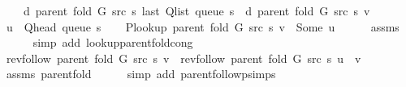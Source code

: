 \begin{isabellebody}
\ \ \ \ {\isachardoublequoteopen}d\ {\isacharparenleft}{\kern0pt}parent\ {\isacharparenleft}{\kern0pt}fold\ G\ src\ s{\isacharparenright}{\kern0pt}{\isacharparenright}{\kern0pt}\ {\isacharparenleft}{\kern0pt}last\ {\isacharparenleft}{\kern0pt}Q{\isacharunderscore}{\kern0pt}list\ {\isacharparenleft}{\kern0pt}queue\ s{\isacharparenright}{\kern0pt}{\isacharparenright}{\kern0pt}{\isacharparenright}{\kern0pt}\ {\isasymle}\ d\ {\isacharparenleft}{\kern0pt}parent\ {\isacharparenleft}{\kern0pt}fold\ G\ src\ s{\isacharparenright}{\kern0pt}{\isacharparenright}{\kern0pt}\ v{\isachardoublequoteclose}%
\endisataginvisible
{\isafoldinvisible}%
%
\isadeliminvisible
\isanewline
%
\endisadeliminvisible
%
\isadelimproof
%
\endisadelimproof
%
\isatagproof
{}\isamarkupfalse%
\ {\isacharminus}{\kern0pt}\isanewline
\ \ \isamarkupfalse%
\ {\isacharquery}{\kern0pt}u\ {\isacharequal}{\kern0pt}\ {\isachardoublequoteopen}Q{\isacharunderscore}{\kern0pt}head\ {\isacharparenleft}{\kern0pt}queue\ s{\isacharparenright}{\kern0pt}{\isachardoublequoteclose}\isanewline
\ \ \isamarkupfalse%
\ {\isachardoublequoteopen}P{\isacharunderscore}{\kern0pt}lookup\ {\isacharparenleft}{\kern0pt}parent\ {\isacharparenleft}{\kern0pt}fold\ G\ src\ s{\isacharparenright}{\kern0pt}{\isacharparenright}{\kern0pt}\ v\ {\isacharequal}{\kern0pt}\ Some\ {\isacharquery}{\kern0pt}u{\isachardoublequoteclose}\isanewline
\ \ \ \ \isamarkupfalse%
\ assms\isanewline
\ \ \ \ \isamarkupfalse%
\ {\isacharparenleft}{\kern0pt}simp\ add{\isacharcolon}{\kern0pt}\ lookup{\isacharunderscore}{\kern0pt}parent{\isacharunderscore}{\kern0pt}fold{\isacharunderscore}{\kern0pt}cong{\isacharparenright}{\kern0pt}\isanewline
\ \ \isamarkupfalse%
\ {\isachardoublequoteopen}rev{\isacharunderscore}{\kern0pt}follow\ {\isacharparenleft}{\kern0pt}parent\ {\isacharparenleft}{\kern0pt}fold\ G\ src\ s{\isacharparenright}{\kern0pt}{\isacharparenright}{\kern0pt}\ v\ {\isacharequal}{\kern0pt}\ rev{\isacharunderscore}{\kern0pt}follow\ {\isacharparenleft}{\kern0pt}parent\ {\isacharparenleft}{\kern0pt}fold\ G\ src\ s{\isacharparenright}{\kern0pt}{\isacharparenright}{\kern0pt}\ {\isacharquery}{\kern0pt}u\ {\isacharat}{\kern0pt}\ {\isacharbrackleft}{\kern0pt}v{\isacharbrackright}{\kern0pt}{\isachardoublequoteclose}\isanewline
\ \ \ \ \isamarkupfalse%
\ assms{\isacharparenleft}{\kern0pt}{}{\isacharparenright}{\kern0pt}\ parent{\isacharunderscore}{\kern0pt}fold\isanewline
\ \ \ \ \isamarkupfalse%
\ {\isacharparenleft}{\kern0pt}simp\ add{\isacharcolon}{\kern0pt}\ parent{\isachardot}{\kern0pt}follow{\isacharunderscore}{\kern0pt}psimps{\isacharparenright}{\kern0pt}\isanewline

\end{isabellebody}
